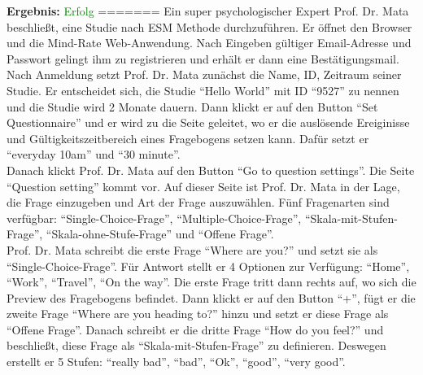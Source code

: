 \documentclass[a4paper]{scrreprt}
\begin{document}
				\par {\color{blue}{Er m\"ochte jetzt die Antwort sehen. Daher klickt er auf den K\"astchen neben dem Name der Studie, w\"ahlt ``Delete selected studies'' und klickt auf ``Go''. Dann wird eine CSV-Datei heruntergeladen. Er \"offnet die Datei und kann schließlich alle Informationen \"uber die Antwort sehen: Studien-ID, Fragebogen-ID, Frage, Antwort, Antwortzeit und Sensorwert. Er ist mit seiner Arbeit sehr zufrieden.}}
		      		           \vspace*{0.3cm}
		      		           \par \textbf{Ergebnis: }\textcolor{green}{Erfolg}
		      		           \vspace*{0.6cm}  	
=======
                Ein super psychologischer Expert Prof. Dr. Mata beschließt, eine Studie nach ESM Methode durchzuf\"uhren. Er \"offnet den Browser und die Mind-Rate Web-Anwendung. Nach Eingeben g\"ultiger Email-Adresse und Passwort gelingt ihm zu registrieren und erh\"alt er dann eine Bestätigungsmail. \\
                Nach Anmeldung setzt Prof. Dr. Mata zun\"achst die Name, ID, Zeitraum seiner Studie. Er entscheidet sich, die Studie ``Hello World'' mit ID ``9527'' zu nennen und die Studie wird 2 Monate dauern. Dann klickt er auf den Button ``Set Questionnaire'' und er wird zu die Seite geleitet, wo er die auslösende Ereiginisse und G\"ultigkeitszeitbereich eines Fragebogens setzen kann. Daf\"ur setzt er ``everyday 10am'' und ``30 minute''. \\
                Danach klickt Prof. Dr. Mata auf den Button ``Go to question settings''. Die Seite ``Question setting'' kommt vor. Auf dieser Seite ist Prof. Dr. Mata in der Lage, die Frage einzugeben und Art der Frage auszuw\"ahlen. F\"unf Fragenarten sind verf\"ugbar: ``Single-Choice-Frage'', ``Multiple-Choice-Frage'', ``Skala-mit-Stufen-Frage'', ``Skala-ohne-Stufe-Frage'' und ``Offene Frage''. \\
                Prof. Dr. Mata schreibt die erste Frage ``Where are you?'' und setzt sie als ``Single-Choice-Frage''. Für Antwort stellt er 4 Optionen zur Verf\"ugung: ``Home'', ``Work'', ``Travel'', ``On the way''. Die erste Frage tritt dann rechts auf, wo sich die Preview des Fragebogens befindet. Dann klickt er auf den Button ``+'', f\"ugt er die zweite Frage ``Where are you heading to?'' hinzu und setzt er diese Frage als ``Offene Frage''. Danach schreibt er die dritte Frage ``How do you feel?'' und beschließt, diese Frage als ``Skala-mit-Stufen-Frage'' zu definieren. Deswegen erstellt er 5 Stufen: ``really bad'', ``bad'', ``Ok'', ``good'', ``very good''. \\
\end{document}
